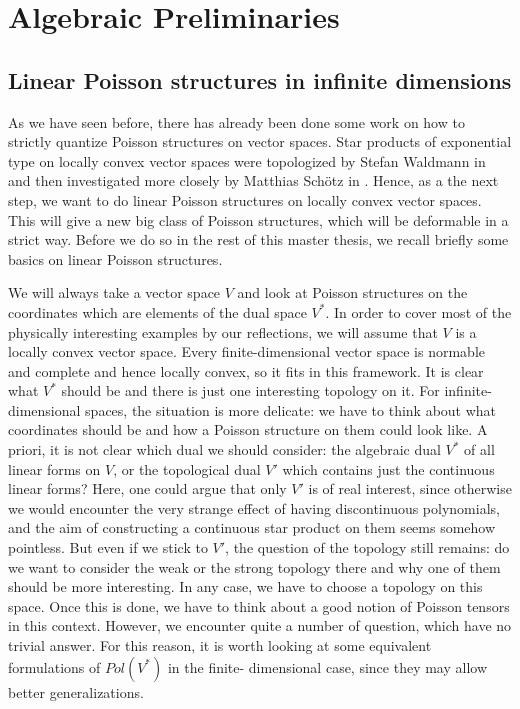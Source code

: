  
%
%

\chapter{Algebraic Preliminaries}


\section{Linear Poisson structures in infinite dimensions}
\label{sec:chap3_LinearPoisson}

As we have seen before, there has already been done some work on how to 
strictly quantize Poisson structures on vector spaces. Star products of
exponential type on locally convex vector spaces were topologized by Stefan 
Waldmann in \cite{waldmann:2014a} and then investigated more closely by 
Matthias Schötz in \cite{schoetz:2014a}. Hence, as a the next step, we want 
to do linear Poisson structures on locally convex vector spaces. This 
will give a new big class of Poisson structures, which will be deformable 
in a strict way. Before we do so in the rest of this master thesis, we 
recall briefly some basics on linear Poisson structures.


We will always take a vector space $V$ and look at Poisson structures on 
the coordinates which are elements of the dual space $V^*$. In order to 
cover most of the physically interesting examples by our reflections, we 
will assume that $V$ is a locally convex vector space. Every 
finite-dimensional vector space is normable and complete and hence locally convex, 
so it fits in this framework. It is clear what $V^*$ should be and there is 
just one interesting topology on it. For infinite-dimensional spaces, the 
situation is more delicate: we have to think about what coordinates should 
be and how a Poisson structure on them could look like. A priori, it is not 
clear which dual we should consider: the algebraic dual $V^*$ of all linear 
forms on $V$, or the topological dual $V'$ which contains just the 
continuous linear forms? Here, one could argue that only $V'$ is of real 
interest, since otherwise we would encounter the very strange effect of 
having discontinuous polynomials, and the aim of constructing a continuous 
star product on them seems somehow pointless. 
But even if we stick to $V'$, the question of the topology still remains: 
do we want to consider the weak or the strong topology there and why one of 
them should be more interesting. In any case, we have to choose a topology 
on this space. Once this is done, we have to think about a good notion of 
Poisson tensors in this context. However, we encounter quite a number of 
question, which have no trivial answer. For this reason, it is worth 
looking at some equivalent formulations of $Pol(V^*)$ in the finite-
dimensional case, since they may allow better generalizations.


